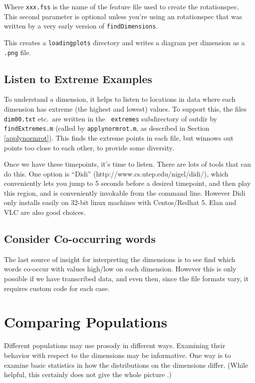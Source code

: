 \documentclass[11pt]{article}
\begin{document}
Where {\tt xxx.fss} is the name of the feature file used to create the
rotationspec.  This second parameter is optional unless you're using
an rotationspec that was written by a very early version of
{\tt findDimensions}.

This creates a {\tt loadingplots} directory and writes a diagram
per dimension as a {\tt .png} file.

\subsection{Listen to Extreme Examples}

To understand a dimension, it helps to listen to locations in data
where each dimension has extreme (the highest and lowest) values.  To
support this, the files {\tt dim00.txt} etc.\ are written in the {\tt
  extremes} subdirectory of outdir by {\tt findExtremes.m} (called by
{\tt applynormrot.m}, as described in Section \ref{applynormrot}).
This finds the extreme points in each file, but winnows out points too
close to each other, to provide some diversity.

Once we have these timepoints, it's time to listen.  There are lots of
tools that can do this.  One option is ``Didi''
(http://www.cs.utep.edu/nigel/didi/), which conveniently lets you jump
to 5 seconds before a desired timepoint, and then play this region,
and is conveniently invokable from the command line.  However Didi
only installs easily on 32-bit linux machines with Centos/Redhat 5.
Elan and VLC are also good choices.


\subsection{Consider Co-occurring words} 

The last source of insight for interpreting the dimensions is to see
find which words co-occur with values high/low on each dimension.
However this is only possible if we have transcribed data, and even
then, since the file formats vary, it requires custom code for each
case.


\section{Comparing Populations}    \label{sec:subpopulations}

Different populations may use prosody in different ways.  Examining
their behavior with respect to the dimensions may be informative.  One
way is to examine basic statistics in how the distributions on the
dimensions differ.  (While helpful, this certainly does not give the
whole picture \cite{l2english}.)
\end{document}
